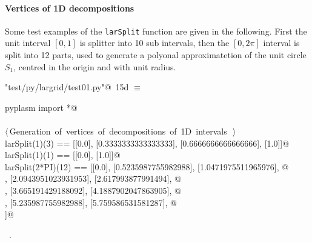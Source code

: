 \documentclass[11pt,oneside]{article}	%
\begin{document}
\paragraph{Vertices of 1D decompositions}
Some test examples of the \texttt{larSplit} function are given in the following. First the unit interval $[0,1]$ is splitter into 10 sub intervals, then the $[0,2\pi]$ interval is split into 12 parts, used to generate a polyonal approximatetion of the unit circle $S_1$, centred in the origin and with unit radius.

\begin{flushleft} \small \label{scrap26}
\protect{}\verb@"test/py/largrid/test01.py"@\nobreak\ {\footnotesize 15d }$\equiv$
\vspace{-1ex}
\begin{list}{}{} \item
\mbox{}\verb@from pyplasm import *@\\
\mbox{}\verb@@\\
\mbox{}\verb@@\hbox{$\langle\,$Generation of vertices of decompositions of 1D intervals\nobreak\ {\footnotesize {}}$\,\rangle$}\verb@@\\
\mbox{}\verb@assert larSplit(1)(3) == [[0.0], [0.3333333333333333], [0.6666666666666666], [1.0]]@\\
\mbox{}\verb@assert larSplit(1)(1) == [[0.0], [1.0]]@\\
\mbox{}\verb@assert larSplit(2*PI)(12) == [[0.0], [0.5235987755982988], [1.0471975511965976], @\\
\mbox{}\verb@[1.5707963267948966], [2.0943951023931953], [2.617993877991494], @\\
\mbox{}\verb@[3.141592653589793], [3.665191429188092], [4.1887902047863905], @\\
\mbox{}\verb@[4.71238898038469], [5.235987755982988], [5.759586531581287], @\\
\mbox{}\verb@[6.283185307179586]]@\\
\mbox{}\verb@@{\NWsep}
\end{list}
\vspace{-1ex}
\footnotesize\addtolength{\baselineskip}{-1ex}
\begin{list}{}{\setlength{\itemsep}{-\parsep}\setlength{\itemindent}{-\leftmargin}}
\item \NWtxtFileDefBy\ .
\end{list}
\end{flushleft}
\end{document}
